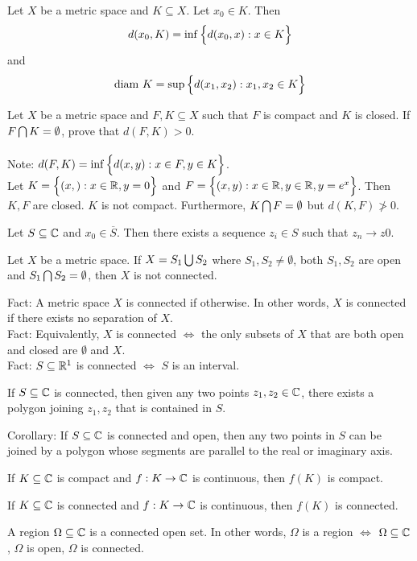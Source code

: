 \documentclass[12pt]{article}
\begin{document}
\begin{definition} Let $X$ be a metric space and $K \subseteq X$. Let $x_0 \in K$. Then 
$$d(x_0, K) = \inf\Big\{ d(x_0,x): x \in K \Big\}$$ and $$\text{diam } K = \sup\Big\{ d(x_1,x_2): x_1,x_2 \in K \Big\} $$ \end{definition} 
Let $X$ be a metric space and $F,K \subseteq X$ such that $F$ is compact and $K$ is closed. If $F \bigcap K = \emptyset$, prove that $d(F,K) > 0$. \\~\\
Note: $d(F,K) = \inf\Big\{ d(x,y): x \in F, y \in K \Big\}$. \\
Let $K = \Big\{  (x,): x \in \mathbb{R}, y = 0 \Big\}$ and $F = \Big\{ (x,y): x \in \mathbb{R}, y \in \mathbb{R}, y = e^x \Big\}$. Then $K,F$ are closed. $K$ is not compact. Furthermore, $K \bigcap F = \emptyset$ but $d(K,F) \ngtr 0$. 
\begin{definition} Let $S \subseteq \mathbb{C}$ and $x_0 \in \overline{S}$. Then there exists a sequence $z_i \in S$ such that $z_n \to z0$. \end{definition} 
\begin{definition} Let $X$ be a metric space. If $X = S_1 \bigcup S_2$ where $S_1,S_2 \neq \emptyset$, both $S_1,S_2$ are open and $S_1 \bigcap S_2 = \emptyset$, then $X$ is not connected. \end{definition} 
Fact: A metric space $X$ is connected if otherwise. In other words, $X$ is connected if there exists no separation of $X$. \\
Fact: Equivalently, $X$ is connected $\iff$ the only subsets of $X$ that are both open and closed are $\emptyset$ and $X$. \\
Fact: $S \subseteq \mathbb{R}^1$ is connected $\iff$ $S$ is an interval.
\begin{theorem} If $S \subseteq \mathbb{C}$ is connected, then given any two points $z_1,z_2 \in \mathbb{C}$, there exists a polygon joining $z_1,z_2$ that is contained in $S$. \end{theorem} 
Corollary: If $S \subseteq \mathbb{C}$ is connected and open, then any two points in $S$ can be joined by a polygon whose segments are parallel to the real or imaginary axis. 
\begin{definition} If $K \subseteq \mathbb{C}$ is compact and $f:K \to \mathbb{C}$ is continuous, then $f(K)$ is compact. \end{definition} 
\begin{definition} If $K \subseteq \mathbb{C}$ is connected and $f:K \to \mathbb{C}$ is continuous, then $f(K)$ is connected. \end{definition} 
\begin{definition} A region $\Omega \subseteq \mathbb{C}$ is a connected open set. In other words, $\Omega$ is a region $\iff$ $\Omega \subseteq \mathbb{C}$, $\Omega$ is open, $\Omega$ is connected. \end{definition} 
\end{document}
